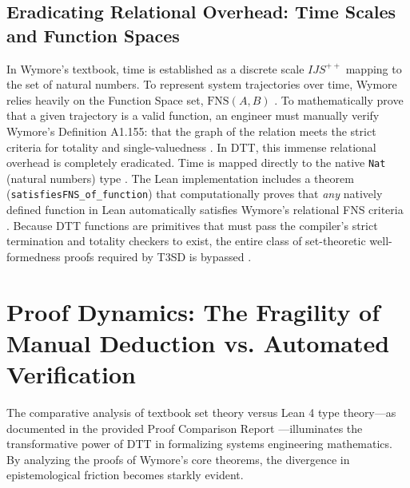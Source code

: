 \documentclass[11pt]{article}
\begin{document}
\subsection{Eradicating Relational Overhead: Time Scales and Function Spaces}
In Wymore's textbook, time is established as a discrete scale $IJS^{++}$ mapping to the set of natural numbers. To represent system trajectories over time, Wymore relies heavily on the Function Space set, $\text{FNS}(A, B)$ \parencite{Ref23, Ref23}. To mathematically prove that a given trajectory is a valid function, an engineer must manually verify Wymore's Definition A1.155: that the graph of the relation meets the strict criteria for totality and single-valuedness \parencite{Ref27}. In DTT, this immense relational overhead is completely eradicated. Time is mapped directly to the native \texttt{Nat} (natural numbers) type \parencite{Ref23, Ref23}. The Lean implementation includes a theorem (\texttt{satisfiesFNS\_of\_function}) that computationally proves that \textit{any} natively defined function in Lean automatically satisfies Wymore's relational FNS criteria \parencite{Ref27}. Because DTT functions are primitives that must pass the compiler's strict termination and totality checkers to exist, the entire class of set-theoretic well-formedness proofs required by T3SD is bypassed \parencite{Ref23, Ref23}.\section{Proof Dynamics: The Fragility of Manual Deduction vs. Automated Verification}

The comparative analysis of textbook set theory versus Lean 4 type theory---as documented in the provided Proof Comparison Report \parencite{Ref27}---illuminates the transformative power of DTT in formalizing systems engineering mathematics. By analyzing the proofs of Wymore's core theorems, the divergence in epistemological friction becomes starkly evident.
\end{document}
